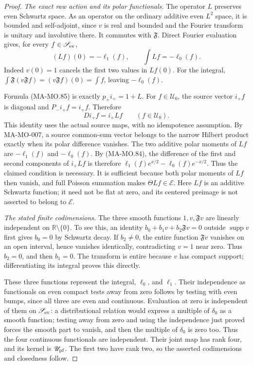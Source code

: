\begin{proof}
\emph{The exact raw action and its polar functionals.}
The operator \(L\) preserves even Schwartz space. As an operator on
the ordinary additive even \(L^2\) space, it is bounded and
self-adjoint, since \(v\) is real and bounded and the Fourier
transform is unitary and involutive there. It commutes with
\(\mathfrak F\). Direct Fourier evaluation gives, for every
\(f\in\mathscr S_{\rm ev}\),
\[
                 (Lf)(0)=-\ell_1(f),\qquad
                        \int Lf=-\ell_0(f).
 \tag{MA-MO.91}
\]
Indeed \(v(0)=1\) cancels the first two values in \(Lf(0)\).
For the integral, \(\int\mathfrak F(v\mathfrak Ff)
=(v\mathfrak Ff)(0)=\int f\), leaving \(-\ell_0(f)\).

Formula (MA-MO.85) is exactly
\(p_+i_+=1+L\). For \(f\in\mathscr U_0\), the source vector
\(i_+f\) is diagonal and \(P_-i_+f=i_+f\). Therefore
\[
                       D i_+f=i_+Lf
                              \qquad(f\in\mathscr U_0).
 \tag{MA-MO.92}
\]
This identity uses the actual source maps, with no idempotence
assumption. By MA-MO-007, a source common-sum vector belongs to
the narrow Hilbert product exactly when its polar difference
vanishes. The two additive polar moments of \(Lf\) are
\(-\ell_1(f)\) and \(-\ell_0(f)\). By (MA-MO.84), the
difference of the first and second components of \(i_+Lf\)
is therefore \(\ell_1(f)e^{x/2}-\ell_0(f)e^{-x/2}\).
Thus the claimed condition is necessary.
It is sufficient because both polar moments of \(Lf\) then
vanish, and full Poisson summation makes
\(\Theta Lf\in\mathcal E\). Here \(Lf\) is an additive
Schwartz function; it need not be flat at zero, and its
centered preimage is not asserted to belong to \(\mathcal E\).

\emph{The stated finite codimensions.}
The three smooth functions
\(1,v,\mathfrak Fv\) are linearly independent on
\(\mathbb R\setminus\{0\}\). To see this, an identity
\(b_0+b_1v+b_2\mathfrak Fv=0\) outside \(\operatorname{supp}v\)
first gives \(b_0=0\) by Schwartz decay. If \(b_2\ne0\),
the entire function \(\mathfrak Fv\) vanishes on an open
interval, hence vanishes identically, contradicting \(v=1\)
near zero. Thus \(b_2=0\), and then \(b_1=0\).
The transform is entire because \(v\) has compact support;
differentiating its integral proves this directly.

These three functions represent the integral, \(\ell_0\),
and \(\ell_1\). Their independence as functionals on even
compact tests away from zero follows by testing with even
bumps, since all three are even and continuous. Evaluation
at zero is independent of them on \(\mathscr S_{\rm ev}\):
a distributional relation would express a multiple of
\(\delta_0\) as a smooth function; testing away from zero
and using the independence just proved forces the smooth
part to vanish, and then the multiple of \(\delta_0\) is
zero too. Thus the four continuous functionals are independent.
Their joint map has rank four, and its kernel is
\(\mathscr U_{\rm pf}\). The first two have rank two,
so the asserted codimensions and closedness follow.


\end{proof}
